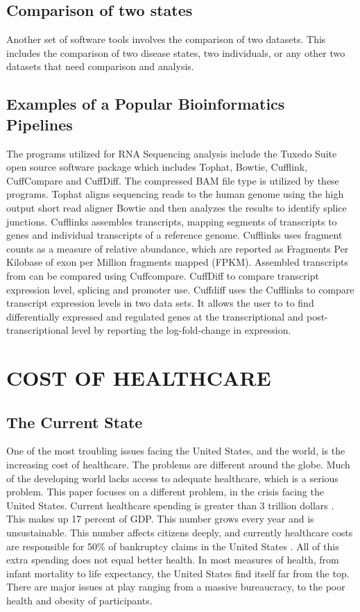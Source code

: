\documentclass[sigconf]{acmart}
\begin{document}
\subsection{Comparison of two states} 
Another set of software tools involves the comparison of two datasets.  This includes the comparison of two disease states, two individuals, or any other two datasets that need comparison and analysis.   

\subsection{Examples of a Popular Bioinformatics Pipelines}  
The programs utilized for RNA Sequencing analysis include the Tuxedo Suite open source software package which includes Tophat, Bowtie, Cufflink, CuffCompare and CuffDiff.  The compressed BAM file type  is utilized by these programs.  Tophat aligns  sequencing reads to the human genome using the high output short read aligner Bowtie and then analyzes the results to identify splice junctions.  Cufflinks assembles transcripts, mapping segments of transcripts to genes and individual transcripts of a reference genome.  Cufflinks uses fragment counts as a measure of relative abundance, which are reported as Fragments Per Kilobase of exon per Million fragments mapped (FPKM).  Assembled transcripts from can be compared using Cuffcompare.  CuffDiff to compare transcript expression level, splicing and promoter use.  Cuffdiff uses the Cufflinks to compare transcript expression levels in two data sets.  It allows  the user to to find differentially expressed and regulated genes at the transcriptional and post-transcriptional level by reporting the log-fold-change in expression.  

\section{COST OF HEALTHCARE}

\subsection{The Current State}

One of the most troubling issues facing the United States, and the
world, is the increasing cost of healthcare.  The problems are
different around the globe.  Much of the developing world lacks access
to adequate healthcare, which is a serious problem. This paper focuses
on a different problem, in the crisis facing the United
States. Current healthcare spending is greater than 3 trillion dollars
\cite{centers2014national}.  This makes up 17 percent of GDP.  This number grows every year
and is unsustainable.  This number affects citizens deeply, and
currently healthcare costs are responsible for 50\% of bankruptcy
claims in the United States \cite{fox6}. All of this extra spending does not
equal better health.  In most measures of health, from infant
mortality to life expectancy, the United States find itself far from
the top.  There are major issues at play ranging from a massive
bureaucracy, to the poor health and obesity of participants.
\end{document}
